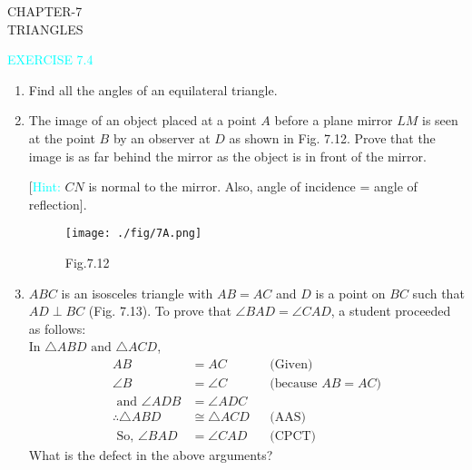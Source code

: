 \documentclass {article}
\begin{document}
\begin{center}
	{\Large CHAPTER-7\\\vspace{0.2cm} TRIANGLES}
\end{center}

\textcolor{cyan}{\large EXERCISE 7.4}
\begin {enumerate}
\item Find all the angles of an equilateral triangle.
\item The image of an object placed at a point $A$ before a plane mirror $LM$ is seen at the point $B$ by an observer at $D$ as shown in Fig. 7.12. Prove that the image is as far behind the mirror as the object is in front  of the mirror.

[\textcolor{cyan}{Hint:} $CN$ is normal to the mirror. Also, angle of incidence = angle of reflection].
\begin{figure}[!h]
\centering
	\texttt{[image: ./fig/7A.png]}
\caption*{Fig.7.12}
\label{Fig.7.12}
\end{figure}
\item $ABC$ is an isosceles triangle with $AB = AC$ and $D$ is a point on $BC$ such that $AD\perp  BC$ (Fig. 7.13). To prove that $\angle BAD = \angle CAD$, a student proceeded as follows:\\
In $\triangle  ABD \text{ and }\triangle  ACD$,
\begin{align*}
AB &= AC &&\text{(Given)}\\
\angle B &= \angle C &&\text{(because $AB = AC$)}\\
\text{ and }
\angle ADB &= \angle ADC\\
\therefore \triangle  ABD &\cong  \triangle ACD &&\text {(AAS)} \\
\text { So, }  \angle BAD &= \angle CAD &&\text{(CPCT)}
\end{align*}
What is the defect in the above arguments?


\end{enumerate}
\end{document}
